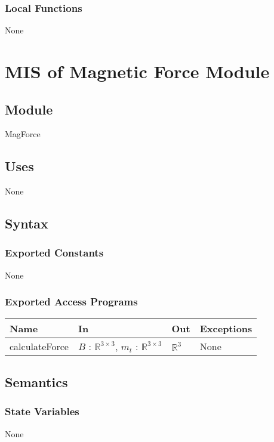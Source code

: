 \documentclass[12pt, titlepage]{article}
\begin{document}
\subsubsection{Local Functions}
None

\newpage

\section{MIS of Magnetic Force Module} \label{MISMagForce}

\subsection{Module}
MagForce 

\subsection{Uses}
None

\subsection{Syntax}

\subsubsection{Exported Constants}
None 

\subsubsection{Exported Access Programs}
\begin{center}
  \begin{tabular}{p{3cm} p{4cm} p{4cm} p{3cm}}
  \hline
  \textbf{Name} & \textbf{In} & \textbf{Out} & \textbf{Exceptions} \\
  \hline
  calculateForce &  $B$ : $\mathbb{R}^{3 \times 3}$, $m_t$ : $\mathbb{R}^{3 \times 3}$ & $\mathbb{R}^3$ & None \\
  \hline
  \end{tabular}
  \end{center}

\subsection{Semantics}

\subsubsection{State Variables}
None
\end{document}
